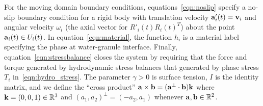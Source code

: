 For the moving domain boundary conditions,
equations~\eqref{eqn:noslip} specify a no-slip boundary condition for a
rigid body with translation velocity $\aa'_i(t) = \vv_i$ and angular
velocity $\omega_i$ (the axial vector for $R'_i(t)R_i(t)^T$)
about the point $\aa_i(t) \in U_i(t)$. In
equation~\eqref{eqn:material}, the function $h_i$ is a material label
specifying the phase at water-granule interface.
Finally, equation~\eqref{eqn:stressbalance} closes the system by requiring that
the force and torque generated by hydrodynamic stress balances that
generated by phase stress $T_i$ in~\eqref{eqn:hydro_stress}. The
parameter $\gamma > 0$ is surface tension,
$I$ is the identity matrix,
and we define the ``cross product'' 
$\aa \times \bb = (\aa^{\perp} \cdot \bb) \kk$ where $\kk = (0,0,1) \in
\RR^3$ and $(a_1,a_2)^{\perp} = (-a_2,a_1)$ whenever $\aa, \bb \in \mathbb{R}^2$.

